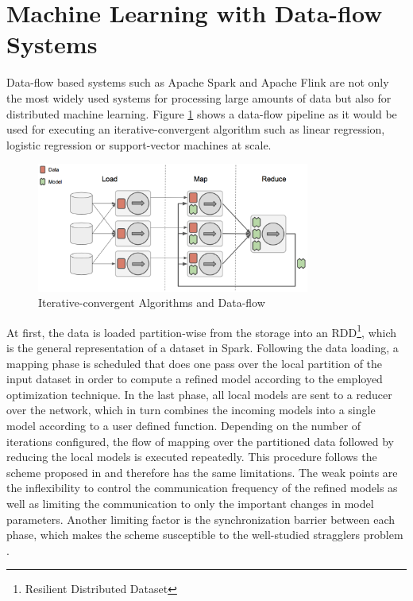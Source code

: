 \section{Machine Learning with Data-flow Systems}
\label{s:dataflow}
Data-flow based systems such as Apache Spark \cite{Zaharia2010} and Apache Flink \cite{Alexandrov2014} are not only the most widely used systems for processing large amounts of data but also for distributed machine learning.
Figure \ref{fig:ml_dataflow} shows a data-flow pipeline as it would be used for executing an iterative-convergent algorithm such as linear regression, logistic regression or support-vector machines at scale.
\begin{figure}[ht]
\centering
\includegraphics[width=0.8\textwidth]{img/ml_dataflow.png}
\caption{Iterative-convergent Algorithms and Data-flow}
\label{fig:ml_dataflow}
\end{figure}
At first, the data is loaded partition-wise from the storage into an RDD\footnote{Resilient Distributed Dataset}, which is the general representation of a dataset in Spark.
Following the data loading, a mapping phase is scheduled that does one pass over the local partition of the input dataset in order to compute a refined model according to the employed optimization technique.
In the last phase, all local models are sent to a reducer over the network, which in turn combines the incoming models into a single model according to a user defined function.
Depending on the number of iterations configured, the flow of mapping over the partitioned data followed by reducing the local models is executed repeatedly.
This procedure follows the scheme proposed in \cite{zinkevich2010parallelized} and therefore has the same limitations.
The weak points are the inflexibility to control the communication frequency of the refined models as well as limiting the communication to only the important changes in model parameters.
Another limiting factor is the synchronization barrier between each phase, which makes the scheme susceptible to the well-studied stragglers problem \cite{ananthanarayanan2013effective}.

